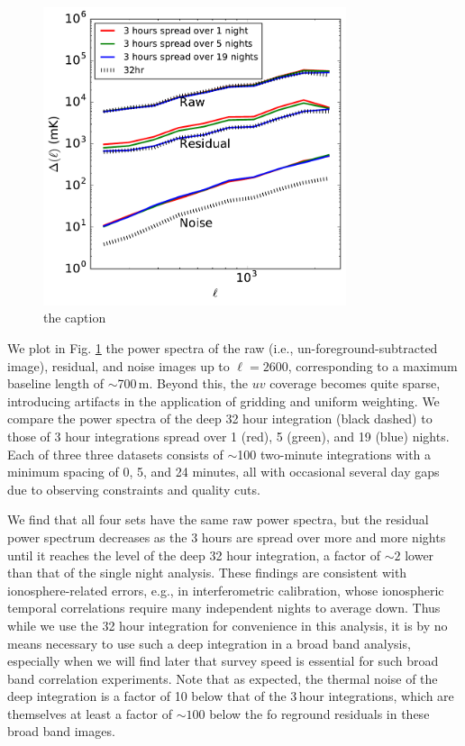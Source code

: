 \documentclass{emulateapj}
\begin{document}
\begin{figure}[h]
\centering
\includegraphics[width=3.5in]{images/res_pspec_of_100_obsids_with_diff_spacings_6amin.pdf}
\caption{the caption}
\label{fig:respspecspacingsstudy}
\end{figure}

We plot in Fig. \ref{fig:respspecspacingsstudy} the power spectra of the raw (i.e., un-foreground-subtracted image), residual, and noise images up to $\ell=2600$, corresponding to a maximum baseline length of $\sim$700\,m. Beyond this, the $uv$ coverage becomes quite sparse, introducing artifacts in the application of gridding and uniform weighting. We compare the power spectra of the deep 32 hour integration (black dashed) to those of 3 hour integrations spread over 1 (red), 5 (green), and 19 (blue) nights. Each of three three datasets consists of $\sim$100 two-minute integrations with a minimum spacing of 0, 5, and 24 minutes, all with occasional several day gaps due to observing constraints and quality cuts. 

We find that all four sets have the same raw power spectra, but the residual power spectrum decreases as the 3 hours are spread over more and more nights until it reaches the level of the deep 32 hour integration, a factor of $\sim2$ lower than that of the single night analysis. These findings are consistent with ionosphere-related errors, e.g., in interferometric calibration, whose ionospheric temporal correlations require many independent nights to average down. Thus while we use the 32 hour integration for convenience in this analysis, it is by no means necessary to use such a deep integration in a broad band analysis, especially when we will find later that survey speed is essential for such broad band correlation experiments. Note that as expected, the thermal noise of the deep integration is a factor of 10 below that of the 3\,hour integrations, which are themselves at least a factor of $\sim100$ below the fo reground residuals in these broad band images.
\end{document}
